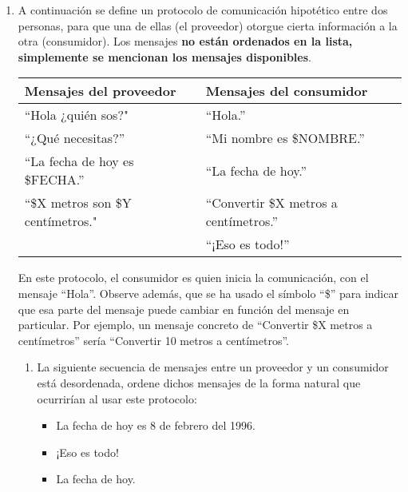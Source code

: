 \documentclass[12pt]{article}
\begin{document}
\begin{enumerate}

    \item A continuación se define un protocolo de comunicación hipotético
        entre dos personas, para que una de ellas (el proveedor) otorgue
        cierta información a la otra (consumidor). Los mensajes \textbf{no
        están ordenados en la lista, simplemente se mencionan los mensajes
        disponibles}.

        \begin{tabular}{|l|l|}
            \hline
            \textbf{Mensajes del proveedor} & \textbf{Mensajes del
            consumidor}\\
            \hline
            ``Hola ¿quién sos?" & ``Hola.''\\
            ``¿Qué necesitas?'' & ``Mi nombre es \$NOMBRE.''\\
            ``La fecha de hoy es \$FECHA.'' & ``La fecha de hoy.''\\
            ``\$X metros son \$Y centímetros." & ``Convertir \$X metros a
            centímetros.''\\
            & ``¡Eso es todo!''\\
            \hline
        \end{tabular}

        En este protocolo, el consumidor es quien inicia la comunicación, con
        el mensaje ``Hola''. Observe además, que se ha usado el símbolo ``\$''
        para indicar que esa parte del mensaje puede cambiar en función del
        mensaje en particular. Por ejemplo, un mensaje concreto de ``Convertir
        \$X metros a centímetros'' sería ``Convertir 10 metros a
        centímetros''.

    \begin{enumerate}

        \item La siguiente secuencia de mensajes entre un proveedor y un
            consumidor está desordenada, ordene dichos mensajes de la forma
            natural que ocurrirían al usar este protocolo: 

        \begin{itemize}

            \item La fecha de hoy es 8 de febrero del 1996.

            \item ¡Eso es todo!

            \item La fecha de hoy.


\end{itemize}
\end{enumerate}
\end{enumerate}
\end{document}
